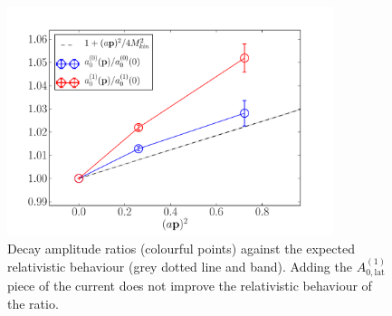 \begin{figure}[htp!]
  \begin{center}
    \includegraphics[width=0.85\textwidth]{images/NRQCD/new/relativistic_normalization_J0J1.pdf}
  \end{center}
  \caption{Decay amplitude ratios (colourful points) against the expected relativistic behaviour (grey dotted line and band). Adding the $A_{0,\text{lat}}^{(1)}$ piece of the current does not improve the relativistic behaviour of the ratio. \label{fig:relativisticnorm}}
\end{figure}


